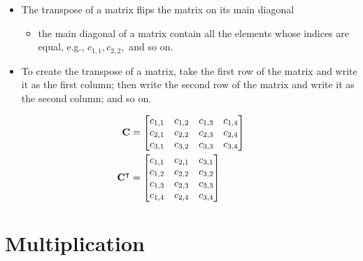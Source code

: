\documentclass[xcolor={table}]{beamer}
\begin{document}
\begin{frame}
\begin{itemize}
\item The transpose of a matrix flips the matrix on its main diagonal
	\begin{itemize}
		\item the main diagonal of a matrix contain all the elements whose indices are equal, e.g., $c_{1,1}, c_{2,2},$ and so on.
	\end{itemize} 
\item To create the transpose of a matrix, take the first row of the matrix and write it as the first column; then write the second row of the matrix and write it as the second column; and so on. 
\end{itemize}
\end{frame}
\begin{frame}
\begin{example} 
	\begin{alignat*}{2}
		\mathbf{C} &= 
		\begin{bmatrix}
			c_{1,1} & c_{1,2} & c_{1,3} & c_{1,4}\\
			c_{2,1} & c_{2,2} & c_{2,3} & c_{2,4}\\
			c_{3,1} & c_{3,2} & c_{3,3} & c_{3,4}\\
		\end{bmatrix} \notag\\
		\mathbf{C}^\intercal &= 
		\begin{bmatrix}
			c_{1,1} & c_{2,1} & c_{3,1}\\
			c_{1,2} & c_{2,2} & c_{3,2}\\
			c_{1,3} & c_{2,3} & c_{3,3}\\
			c_{1,4} &c_{2,4} & c_{3,4}\\
		\end{bmatrix} \notag\\
	\end{alignat*}
\end{example}
\end{frame}

\section{Multiplication}
\end{document}
